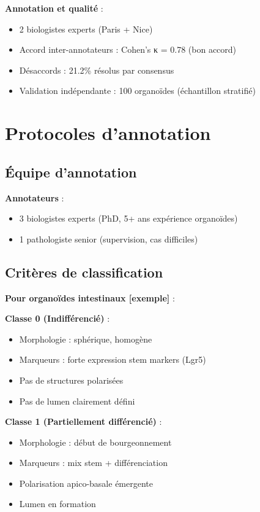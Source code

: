 \textbf{Annotation et qualité} :
\begin{itemize}
    \item 2 biologistes experts (Paris + Nice)
    \item Accord inter-annotateurs : Cohen's κ = 0.78 (bon accord)
    \item Désaccords : 21.2\% résolus par consensus
    \item Validation indépendante : 100 organoïdes (échantillon stratifié)
\end{itemize}

\section{Protocoles d'annotation}

\subsection{Équipe d'annotation}

\textbf{Annotateurs} :
\begin{itemize}
    \item 3 biologistes experts (PhD, 5+ ans expérience organoïdes)
    \item 1 pathologiste senior (supervision, cas difficiles)
\end{itemize}

\subsection{Critères de classification}

\textbf{Pour organoïdes intestinaux [exemple]} :

\textbf{Classe 0 (Indifférencié)} :
\begin{itemize}
    \item Morphologie : sphérique, homogène
    \item Marqueurs : forte expression stem markers (Lgr5)
    \item Pas de structures polarisées
    \item Pas de lumen clairement défini
\end{itemize}

\textbf{Classe 1 (Partiellement différencié)} :
\begin{itemize}
    \item Morphologie : début de bourgeonnement
    \item Marqueurs : mix stem + différenciation
    \item Polarisation apico-basale émergente
    \item Lumen en formation
\end{itemize}


